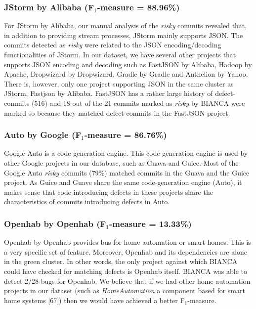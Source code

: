 \documentclass[conference]{IEEEtran}
\begin{document}
\subsubsection{JStorm by Alibaba (F$_1$-measure =
88.96\%)}\label{jstorm-by-alibaba-fux5f1-measure-88.96:}

For JStorm by Alibaba, our manual analysis of the \emph{risky} commits
revealed that, in addition to providing stream processes, JStorm mainly
supports JSON. The commits detected as \emph{risky} were related to the
JSON encoding/decoding functionalities of JStorm. In our dataset, we
have several other projects that supports JSON encoding and decoding
such as FastJSON by Alibaba, Hadoop by Apache, Dropwizard by Dropwizard,
Gradle by Gradle and Anthelion by Yahoo. There is, however, only one
project supporting JSON in the same cluster as JStorm, Fastjson by
Alibaba. FastJSON has a rather large history of defect-commits (516) and
18 out of the 21 commits marked as \emph{risky} by BIANCA were marked so
because they matched defect-commits in the FastJSON project.

\subsubsection{Auto by Google (F$_1$-measure =
86.76\%)}\label{auto-by-google-fux5f1-measure-86.76}

Google Auto is a code generation engine. This code generation engine is
used by other Google projects in our database, such as Guava and Guice.
Most of the Google Auto \emph{risky} commits (79\%) matched commits in
the Guava and the Guice project. As Guice and Guave share the same
code-generation engine (Auto), it makes sense that code introducing
defects in these projects share the characteristics of commits
introducing defects in Auto.

\subsubsection{Openhab by Openhab (F$_1$-measure =
13.33\%)}\label{openhab-by-openhab-fux5f1-measure-13.33}

Openhab by Openhab provides bus for home automation or smart homes. This
is a very specific set of feature. Moreover, Openhab and its
dependencies are alone in the green cluster. In other words, the only
project against which BIANCA could have checked for matching defects is
Openhab itself. BIANCA was able to detect 2/28 bugs for Openhab. We
believe that if we had other home-automation projects in our dataset
(such as \emph{HomeAutomation} a component based for smart home systems
{[}67{]}) then we would have achieved a better F$_1$-measure.
\end{document}
